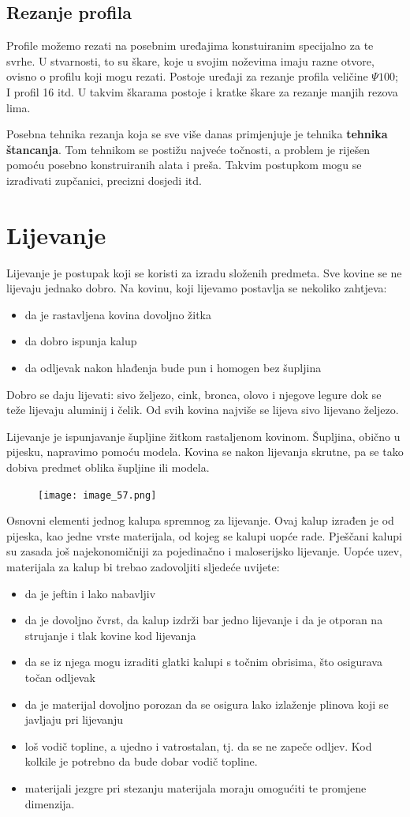 \documentclass[a4paper,12pt]{article}
\numberwithin{figure}{section}
\begin{document}
\subsection{Rezanje profila}
Profile možemo rezati na posebnim uređajima konstuiranim specijalno za te svrhe. U stvarnosti, to su škare, koje u svojim noževima imaju razne otvore, ovisno o profilu koji mogu rezati. Postoje uređaji za rezanje profila veličine $\Psi 100$; I profil 16 itd. U takvim škarama postoje i kratke škare za rezanje manjih rezova lima.\par
Posebna tehnika rezanja koja se sve više danas primjenjuje je tehnika \textbf{tehnika štancanja}. Tom tehnikom se postižu najveće točnosti, a problem je riješen pomoću posebno konstruiranih alata i preša. Takvim postupkom mogu se izrađivati zupčanici, precizni dosjedi itd.
\section{Lijevanje}
Lijevanje je postupak koji se koristi za izradu složenih predmeta. Sve kovine se ne lijevaju jednako dobro. Na kovinu, koji lijevamo postavlja se nekoliko zahtjeva:
\begin{itemize}
\item da je rastavljena kovina dovoljno žitka
\item da dobro ispunja kalup
\item da odljevak nakon hlađenja bude pun i homogen bez šupljina
\end{itemize}
Dobro se daju lijevati: sivo željezo, cink, bronca, olovo i njegove legure dok se teže lijevaju aluminij i čelik. Od svih kovina najviše se lijeva sivo lijevano željezo. \par
Lijevanje je ispunjavanje šupljine žitkom rastaljenom kovinom. Šupljina, obično u pijesku, napravimo pomoću modela. Kovina se nakon lijevanja skrutne, pa se tako dobiva predmet oblika šupljine ili modela.
\begin{figure}[!h]
\centering
\texttt{[image: image\_57.png]}
\end{figure}
\FloatBarrier
Osnovni elementi jednog kalupa spremnog za lijevanje. Ovaj kalup izrađen je od pijeska, kao jedne vrste materijala, od kojeg se kalupi uopće rade. Pješčani kalupi su zasada još najekonomičniji za pojedinačno i maloserijsko lijevanje. Uopće uzev, materijala za kalup bi trebao zadovoljiti sljedeće uvijete:
\begin{itemize}
\item da je jeftin i lako nabavljiv
\item da je dovoljno čvrst, da kalup izdrži bar jedno lijevanje i da je otporan na strujanje i tlak kovine kod lijevanja
\item da se iz njega mogu izraditi glatki kalupi s točnim obrisima, što osigurava točan odljevak
\item da je materijal dovoljno porozan da se osigura lako izlaženje plinova koji se javljaju pri lijevanju
\item loš vodič topline, a ujedno i vatrostalan, tj. da se ne zapeče odljev. Kod kolkile je potrebno da bude dobar vodič topline.
\item materijali jezgre pri stezanju materijala moraju omogućiti te promjene dimenzija. 
\end{itemize}
\end{document}
